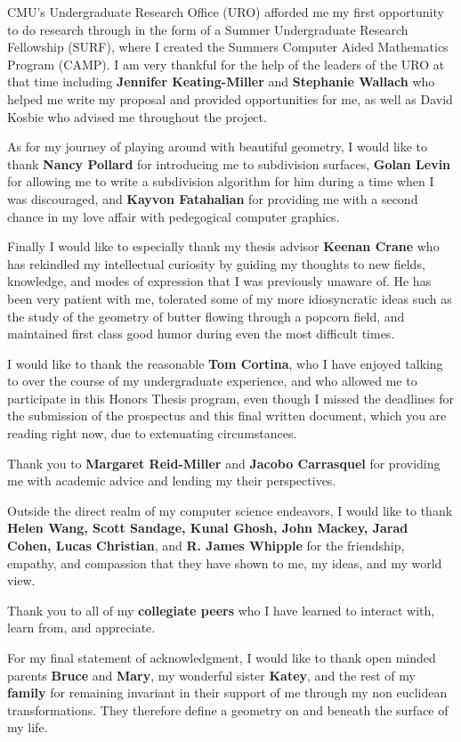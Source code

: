 \documentclass[12pt, letterpaper]{article}
\begin{document}
CMU's Undergraduate Research Office (URO) afforded me my first opportunity to do research through in the form of a
Summer Undergraduate Research Fellowship (SURF), where I created the Summers Computer Aided Mathematics Program (CAMP).
I am very thankful for the help of the leaders of the URO at that time including \textbf{Jennifer Keating-Miller} and \textbf{Stephanie Wallach}
who helped me write my proposal and provided opportunities for me, as well as David Kosbie who advised me throughout the project.

As for my journey of playing around with beautiful geometry, I would like to thank \textbf{Nancy Pollard} for introducing me to subdivision surfaces,
\textbf{Golan Levin} for allowing me to write a subdivision algorithm for him during a time when I was discouraged,
and \textbf{Kayvon Fatahalian} for providing me with a second chance in my love affair with pedegogical computer graphics.

Finally I would like to especially thank my thesis advisor \textbf{Keenan Crane} who has
rekindled my intellectual curiosity by guiding my thoughts to new fields, knowledge, and modes of expression that I was previously unaware of.
He has been very patient with me, tolerated some of my more idiosyncratic ideas such as the study of the geometry of butter flowing through a popcorn field,
and maintained first class good humor during even the most difficult times.

I would like to thank the reasonable \textbf{Tom Cortina}, who I have enjoyed talking to over the course of my undergraduate experience, and who allowed me to 
participate in this Honors Thesis program, even though I missed the deadlines for the submission of the prospectus and this final
written document, which you are reading right now, due to extenuating circumstances.

Thank you to \textbf{Margaret Reid-Miller} and \textbf{Jacobo Carrasquel} for providing me with academic advice and lending my their perspectives.

Outside the direct realm of my computer science endeavors, I would like to thank \textbf{Helen Wang,
	Scott Sandage, Kunal Ghosh, John Mackey, Jarad Cohen, Lucas Christian},
and \textbf{R. James Whipple} for the friendship, empathy, and compassion that they have shown to me, my ideas, and my world view.

Thank you to all of my \textbf{collegiate peers} who I have learned to interact with, learn from, and appreciate.

For my final statement of acknowledgment, I would like to thank open minded parents \textbf{Bruce} and \textbf{Mary},
my wonderful sister \textbf{Katey}, and the rest of my \textbf{family} for remaining
invariant in their support of me through my non euclidean transformations. They therefore define a geometry on and beneath the surface of my life.
\end{document}
